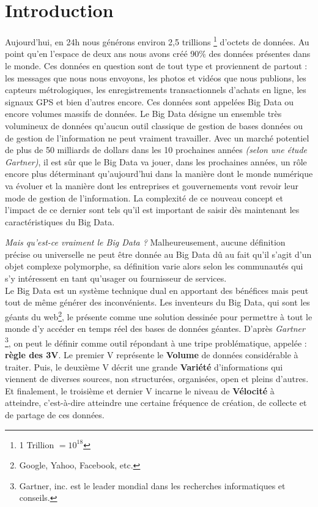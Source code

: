 \documentclass[12pt]{article}
\begin{document}
\tableofcontents
{}
\pagebreak

\section{Introduction}
Aujourd'hui, en 24h nous générons environ 2,5 trillions \footnote{1 Trillion $= 10^{18}$ } d'octets de données. Au point qu'en l'espace de deux ans nous avons créé 90\% des données présentes dans le monde. Ces données en question sont de tout type et proviennent de partout : les messages que nous nous envoyons, les photos et vidéos que nous publions, les capteurs métrologiques, les enregistrements transactionnels d'achats en ligne, les signaux GPS et bien d'autres encore. Ces données sont appelées Big Data ou encore volumes massifs de données. Le Big Data désigne un ensemble très volumineux de données qu'aucun outil classique de gestion de bases données ou de gestion de l'information ne peut vraiment travailler. Avec un marché potentiel de plus de 50 milliards de dollars dans les 10 prochaines années \emph{(selon une étude Gartner)}, il est sûr que le Big Data va jouer, dans les prochaines années, un rôle encore plus déterminant qu'aujourd'hui dans la manière dont le monde numérique va évoluer et la manière dont les entreprises et gouvernements vont revoir leur mode de gestion de l'information. La complexité de ce nouveau concept et l’impact de ce dernier sont tels qu’il est important de saisir dès maintenant les caractéristiques du Big Data. \par
\emph{Mais qu'est-ce vraiment le Big Data ?} Malheureusement, aucune définition précise ou universelle ne peut être donnée au Big Data dû au fait qu'il s'agit d'un objet complexe polymorphe, sa définition varie alors selon les communautés qui s'y intéressent en tant qu'usager ou fournisseur de services.\\ Le Big Data est un système technique dual en apportant des bénéfices mais peut tout de même générer des inconvénients. Les inventeurs du Big Data, qui sont les géants du web\footnote{Google, Yahoo, Facebook, etc.}, le présente comme une solution dessinée pour permettre à tout le monde d’y accéder en temps réel  des bases de données géantes. D'après \emph{Gartner} \footnote{Gartner, inc. est le leader mondial dans les recherches informatiques et conseils.}, on peut le définir comme outil répondant à une tripe problématique, appelée : \textbf{règle des 3V}. Le premier V représente le \textbf{Volume} de données considérable à traiter. Puis, le deuxième V décrit  une grande \textbf{Variété} d'informations qui viennent de diverses sources, non structurées, organisées, open et pleins d'autres. Et finalement, le troisième et dernier V incarne le niveau de \textbf{Vélocité} à atteindre, c'est-à-dire atteindre une certaine fréquence de création, de collecte et de partage de ces données. 
\end{document}
